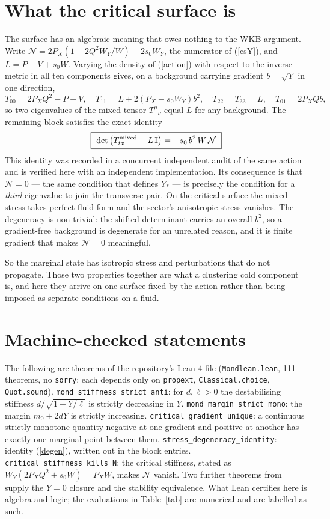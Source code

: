 \documentclass[11pt,letterpaper]{article}
\begin{document}
\section{What the critical surface is}
The surface has an algebraic meaning that owes nothing to the WKB argument. Write $\mathcal{N}=2P_X(1-2Q^2W_Y/W)-2s_0W_Y$, the numerator of (\ref{csY}), and $L=P-V+s_0W$. Varying the density of (\ref{action}) with respect to the inverse metric in all ten components gives, on a background carrying gradient $b=\sqrt{Y}$ in one direction,
\begin{equation}
T_{00}=2P_XQ^2-P+V,\quad T_{11}=L+2(P_X-s_0W_Y)b^2,\quad T_{22}=T_{33}=L,\quad T_{01}=2P_XQb,
\end{equation}
so two eigenvalues of the mixed tensor $T^\mu{}_\nu$ equal $L$ for any background. The remaining block satisfies the exact identity
\begin{equation}
\boxed{\ \det\big(T^{\rm mixed}_{tx}-L\,\mathbb{I}\big)=-s_0\,b^2\,W\,\mathcal{N}\ }
\label{degen}
\end{equation}
This identity was recorded in a concurrent independent audit of the same action and is verified here with an independent implementation. Its consequence is that $\mathcal{N}=0$ --- the same condition that defines $Y_*$ --- is precisely the condition for a \emph{third} eigenvalue to join the transverse pair. On the critical surface the mixed stress takes perfect-fluid form and the sector's anisotropic stress vanishes. The degeneracy is non-trivial: the shifted determinant carries an overall $b^2$, so a gradient-free background is degenerate for an unrelated reason, and it is finite gradient that makes $\mathcal{N}=0$ meaningful.

So the marginal state has isotropic stress and perturbations that do not propagate. Those two properties together are what a clustering cold component is, and here they arrive on one surface fixed by the action rather than being imposed as separate conditions on a fluid.

\section{Machine-checked statements}
The following are theorems of the repository's Lean 4 file (\texttt{Mondlean.lean}, 111 theorems, no \texttt{sorry}; each depends only on \texttt{propext}, \texttt{Classical.choice}, \texttt{Quot.sound}).
\texttt{mond\_stiffness\_strict\_anti}: for $d,\ell>0$ the destabilising stiffness $d/\sqrt{1+Y/\ell}$ is strictly decreasing in $Y$.
\texttt{mond\_margin\_strict\_mono}: the margin $m_0+2dY$ is strictly increasing.
\texttt{critical\_gradient\_unique}: a continuous strictly monotone quantity negative at one gradient and positive at another has exactly one marginal point between them.
\texttt{stress\_degeneracy\_identity}: identity (\ref{degen}), written out in the block entries.
\texttt{critical\_stiffness\_kills\_N}: the critical stiffness, stated as $W_Y(2P_XQ^2+s_0W)=P_XW$, makes $\mathcal{N}$ vanish.
Two further theorems from \cite{paper17} supply the $Y=0$ closure and the stability equivalence. What Lean certifies here is algebra and logic; the evaluations in Table~\ref{tab} are numerical and are labelled as such.
\end{document}
